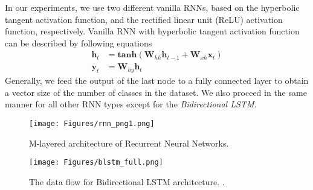 \documentclass[runningheads]{llncs}
\begin{document}
In our experiments, we use two different vanilla RNNs, based on the hyperbolic tangent activation function, and the rectified linear unit (ReLU) activation function, respectively. Vanilla RNN with hyperbolic tangent activation function can be described by following equations
\begin{align*}
    \bm h_t &= \textbf{tanh}\left(\bm W_{hh}\bm h_{t-1} + \bm W_{xh}\bm x_t \right) \\
    \bm y_t &= \bm W_{hy}\bm h_t
\end{align*}
\indent Generally, we feed the output of the last node to a fully connected layer to obtain a vector size of the number of classes in the dataset. We also proceed in the same manner for all other RNN types except for the \textit{Bidirectional LSTM}. 





\begin{figure}[t!]
\begin{minipage}[b]{0.480\linewidth}
\centering
\texttt{[image: Figures/rnn\_png1.png]}
	\caption{M-layered architecture of Recurrent Neural Networks.}
	\label{fig:recurrent}
\end{minipage}
\hfill
\begin{minipage}[b]{0.480\linewidth}
\centering
	\texttt{[image: Figures/blstm\_full.png]}
	\caption{The data flow for Bidirectional LSTM architecture. .}
	\label{fig:bidirectional}
\end{minipage}
\end{figure}
\end{document}
